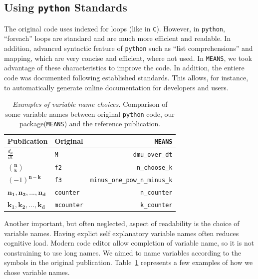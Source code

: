 \documentclass[11pt,a4paper]{article}
\newcommand{\means}{\texttt{MEANS}}
\newcommand{\py}{\texttt{python}}
\begin{document}
\subsection{Using \py{} Standards}
The original code uses indexed for loops (like in \texttt{C}).
However, in \py, ``foreach'' loops are  standard and are much more efficient and readable.
In addition, advanced syntactic feature of \py{} such as ``list comprehensions''  and mapping,
which are very concise and efficient, where not used.
In \means, we took advantage of these characteristics to improve the code.
In addition, the entiere code was documented following established standards.
This allows, for instance, to automatically generate online documentation for developers and users.



\begin{table}
\caption{\emph{Examples of variable name choices.}
Comparison of some  variable names between original \py{} code, our package(\means) and the reference publication.
}

\begin{center}   
	\begin{tabular}{ | l | l | r|}
	\hline
	\bf{Publication\cite{ale_general_2013}} & \bf{Original} & \bf{\means}\\
	\hline
	\hline
	$\frac{d_{\mu}}{dt}$ & \verb"M" & \verb"dmu_over_dt"\\
	\hline
	$\mathbf{n\choose{k}}$ & \verb"f2" & \verb"n_choose_k"\\
	\hline
	$ (-1)^\mathbf{{n-k}}$ & \verb"f3" & \verb"minus_one_pow_n_minus_k"\\
	\hline
	$\mathbf{n_1    , n_2, ..., n_d}$ & \verb"counter" & \verb"n_counter"\\
	\hline
	$\mathbf{k_1, k_2, ..., k_d}$ & \verb"mcounter" & \verb"k_counter"\\
	\hline
	\end{tabular}
\end{center}
\label{tab:varnames}
\end{table}

Another important, but often neglected, aspect of readability is the choice of variable names.
Having explict self explanatory variable names often reduces cognitive load.
Modern code editor allow completion of variable name, so it is not constraining to use long names.
We aimed to name variables according to the symbols in the original publication\cite{ale_general_2013}.
Table~\ref{tab:varnames} represents a few examples of how we chose variable names.
\end{document}
